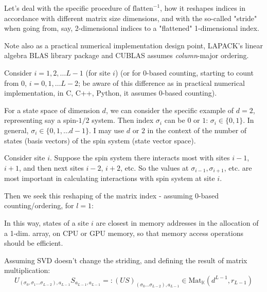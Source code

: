 \documentclass[10pt]{amsart}
\begin{document}
\begin{multicols*}{2}
Let's deal with the specific procedure of $\text{flatten}^{-1}$, how it reshapes indices in accordance with different matrix size dimensions, and with the so-called "stride" when going from, say, 2-dimensional indices to a "flattened" 1-dimensional index.  

Note also as a practical numerical implementation design point, LAPACK's linear algebra BLAS library package and CUBLAS assumes \emph{column}-major ordering.  

Consider $i= 1,2,\dots L-1$ (for site $i$) (or for $0$-based counting, starting to count from $0$, $i=0,1,\dots L-2$; be aware of this difference as in practical numerical implementation, in C, C++, Python, it assumes $0$-based counting).  

For a state space of dimension $d$, we can consider the specific example of $d=2$, representing say a spin-$1/2$ system.  Then index $\sigma_i$ can be $0$ or $1$: $\sigma_i \in \lbrace 0 ,1\rbrace$.  In general, $\sigma_i \in \lbrace 0 ,1, \dots d-1\rbrace$.  I may use $d$ or $2$ in the context of the number of states (basis vectors) of the spin system (state vector space).  

Consider site $i$.  Suppose the spin system there interacts most with sites $i-1$, $i+1$, and then next sites $i-2$, $i+2$, etc.  So the values at $\sigma_{i-1}, \sigma_{i+1}$, etc. are most important in calculating interactions with spin system at site $i$.  

Then we seek this reshaping of the matrix index - assuming $0$-based counting/ordering, for $l=1$:

In this way, states of a site $i$ are closest in memory addresses in the allocation of a 1-dim. array, on CPU or GPU memory, so that memory access operations should be efficient.  

Assuming SVD doesn't change the striding, and defining the result of matrix multiplication:
\[
U_{(\sigma_0, \sigma_1 \dots \sigma_{L-2}), a_{L-1} } S_{a_{L-1}, a_{L-1}} =: (US)_{(\sigma_0 \dots \sigma_{L-2} ), a_{L-1} } \in \text{Mat}_{\mathbb{K}}(d^{L-1},r_{L-1} )
\]


\end{multicols*}
\end{document}

